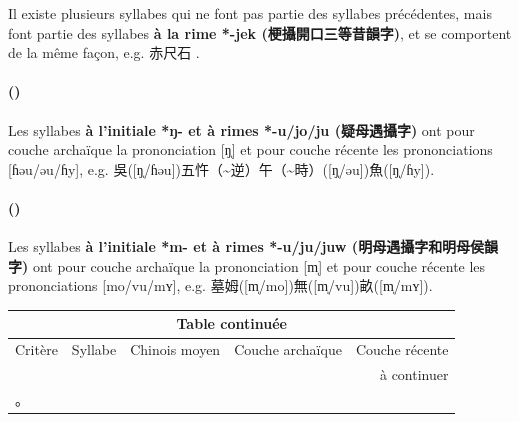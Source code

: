 \documentclass{scrbook}
\newcounter{c}[subsubsection]
\newcommand{\stpc}[1]{\stepcounter{#1}}
\newcommand{\bolang}{\textasciitilde}
\newcommand{\termyyx}[1]{\textbf{#1}}
\begin{document}
\begin{sloppypar}
Il existe plusieurs syllabes qui ne font pas partie des syllabes précédentes, mais font partie %
des syllabes \termyyx{à la rime *-jek (梗攝開口三等昔韻字)}, %
et se comportent de la même façon, e.g. 赤尺石%
.

\stpc{c}\paragraph{()}
Les syllabes \termyyx{à l'initiale *ŋ- et à rimes *-u/jo/ju (疑母遇攝字)} ont pour couche archaïque la prononciation [ŋ̩] et pour couche récente les prononciations [ɦəu/əu/ɦy], e.g. 吳([ŋ̩/ɦəu])五忤（\bolang 逆）午（\bolang 時）([ŋ̩/əu])魚([ŋ̩/ɦy]).

\stpc{c}\paragraph{()}
Les syllabes \termyyx{à l'initiale *m- et à rimes *-u/ju/juw (明母遇攝字和明母侯韻字)} ont pour couche archaïque la prononciation [m̩] et pour couche récente les prononciations [mo/vu/mʏ], e.g. 墓姆([m̩/mo])無([m̩/vu])畝([m̩/mʏ]).

\begin{landscape}
\begin{longtable}[htbp]{lllll}
    \endfirsthead
      
    \multicolumn{5}{c}{Table continuée} \\ 
    \toprule 
     Critère & Syllabe & Chinois moyen  & Couche archaïque & Couche récente \\ 
    \hline 
    \endhead 

    \hline
    \multicolumn{5}{r}{à continuer} \\ 
    \endfoot 。
    \endlastfoot 
    

\end{longtable}
\end{landscape}
\end{sloppypar}
\end{document}
